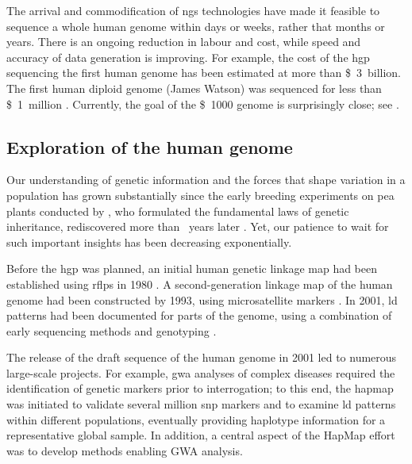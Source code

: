 %

%

The arrival and commodification of \gls{ngs} technologies have made it feasible to sequence a whole human genome within days or weeks, rather that months or years.
There is an ongoing reduction in labour and cost, while speed and accuracy of data generation is improving.
For example, the cost of the \gls{hgp} sequencing the first human genome has been estimated at more than \SI{3}[\$]{billion}.
The first human diploid genome (James Watson) was sequenced for less than \SI{1}[\$]{million} \citep{Wheeler:2008bb}.
Currently, the goal of the \SI{1000}[\$]{} genome is surprisingly close; see .


%
\subsection{Exploration of the human genome}
%

Our understanding of genetic information and the forces that shape variation in a population has grown substantially since the early breeding experiments on pea plants conducted by \citet{Mendel1866}, who formulated the fundamental laws of genetic inheritance, rediscovered more than ~years later \citep{correns1899,vries1900,tschermak1900}.
Yet, our patience to wait for such important insights has been decreasing exponentially.

Before the \gls{hgp} was planned, an initial human genetic linkage map had been established using \glspl{rflp} in 1980 \citep{Botstein:1980wg}.
A second-generation linkage map of the human genome had been constructed by 1993, using microsatellite markers \citep{Weissenbach:1993et}.
In 2001, \gls{ld} patterns had been documented for parts of the genome, using a combination of early sequencing methods and genotyping \citep{Daly:2001ka,Reich:2001ff}.

The release of the draft sequence of the human genome in 2001 led to numerous large-scale projects.
For example, \gls{gwa} analyses of complex diseases required the identification of genetic markers prior to interrogation; to this end, the \gls{hapmap} was initiated to validate several million \gls{snp} markers and to examine \gls{ld} patterns within different populations, eventually providing haplotype information for a representative global sample.
In addition, a central aspect of the HapMap effort was to develop methods enabling GWA analysis.

